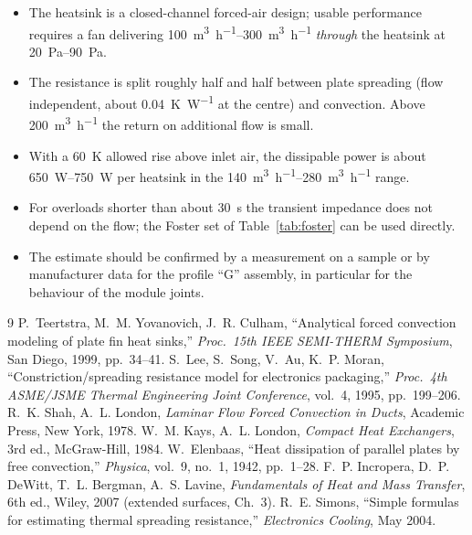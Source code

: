 \documentclass[11pt,a4paper]{article}
\begin{document}
\begin{itemize}
\item The heatsink is a closed-channel forced-air design; usable performance requires a fan delivering \SIrange{100}{300}{\cubic\metre\per\hour} \emph{through} the heatsink at \SIrange{20}{90}{\pascal}.
\item The resistance is split roughly half and half between plate spreading (flow independent, about \SI{0.04}{\kelvin\per\watt} at the centre) and convection. Above \SI{200}{\cubic\metre\per\hour} the return on additional flow is small.
\item With a \SI{60}{\kelvin} allowed rise above inlet air, the dissipable power is about \SIrange{650}{750}{\watt} per heatsink in the \SIrange{140}{280}{\cubic\metre\per\hour} range.
\item For overloads shorter than about \SI{30}{\second} the transient impedance does not depend on the flow; the Foster set of Table~\ref{tab:foster} can be used directly.
\item The estimate should be confirmed by a measurement on a sample or by manufacturer data for the profile ``G'' assembly, in particular for the behaviour of the module joints.
\end{itemize}

\begin{thebibliography}{9}
 P.~Teertstra, M.~M. Yovanovich, J.~R. Culham, ``Analytical forced convection modeling of plate fin heat sinks,'' \emph{Proc.\ 15th IEEE SEMI-THERM Symposium}, San Diego, 1999, pp.~34--41.
 S.~Lee, S.~Song, V.~Au, K.~P. Moran, ``Constriction/spreading resistance model for electronics packaging,'' \emph{Proc.\ 4th ASME/JSME Thermal Engineering Joint Conference}, vol.~4, 1995, pp.~199--206.
 R.~K. Shah, A.~L. London, \emph{Laminar Flow Forced Convection in Ducts}, Academic Press, New York, 1978.
 W.~M. Kays, A.~L. London, \emph{Compact Heat Exchangers}, 3rd ed., McGraw-Hill, 1984.
 W.~Elenbaas, ``Heat dissipation of parallel plates by free convection,'' \emph{Physica}, vol.~9, no.~1, 1942, pp.~1--28.
 F.~P. Incropera, D.~P. DeWitt, T.~L. Bergman, A.~S. Lavine, \emph{Fundamentals of Heat and Mass Transfer}, 6th ed., Wiley, 2007 (extended surfaces, Ch.~3).
 R.~E. Simons, ``Simple formulas for estimating thermal spreading resistance,'' \emph{Electronics Cooling}, May 2004.
\end{thebibliography}
\end{document}
